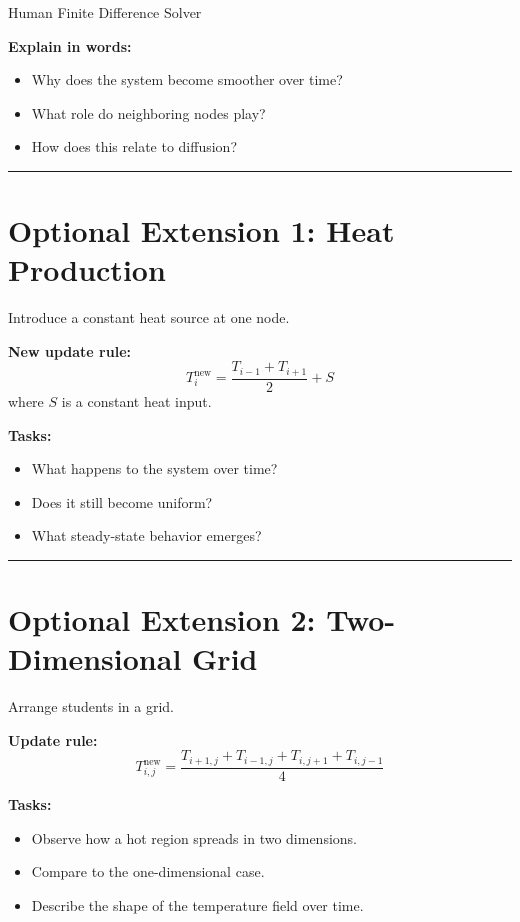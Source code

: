 \begin{activity}{Human Finite Difference Solver}
\begin{questions}
    \textbf{Explain in words:}
    \begin{itemize}
        \item Why does the system become smoother over time?
        \item What role do neighboring nodes play?
        \item How does this relate to diffusion?
    \end{itemize}
    \answerbox[4cm]

\end{questions}

\bigskip
\hrule
\bigskip

\section*{Optional Extension 1: Heat Production}

Introduce a constant heat source at one node.

\textbf{New update rule:}
\begin{equation}
T_i^{\text{new}} = \frac{T_{i-1} + T_{i+1}}{2} + S
\end{equation}
where $S$ is a constant heat input.

\textbf{Tasks:}
\begin{itemize}
    \item What happens to the system over time?
    \item Does it still become uniform?
    \item What steady-state behavior emerges?
\end{itemize}

\bigskip
\hrule
\bigskip

\section*{Optional Extension 2: Two-Dimensional Grid}

Arrange students in a grid.

\textbf{Update rule:}
\begin{equation}
    T_{i,j}^{\text{new}} =
    \frac{ T_{i+1,j} + T_{i-1,j} + T_{i,j+1} + T_{i,j-1} }{4}
\end{equation}


\textbf{Tasks:}
\begin{itemize}
    \item Observe how a hot region spreads in two dimensions.
    \item Compare to the one-dimensional case.
    \item Describe the shape of the temperature field over time.
\end{itemize}


\end{activity}
